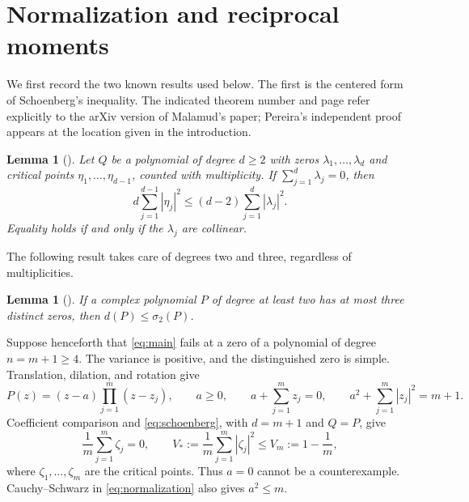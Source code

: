 \documentclass[11pt,reqno]{amsart}
\newtheorem{lem}[thm]{Lemma}
\theoremstyle{definition}
\theoremstyle{remark}
\numberwithin{equation}{section}
\begin{document}
\section{Normalization and reciprocal moments}\label{sec:reduction}

We first record the two known results used below. The first is the centered form of Schoenberg's inequality. The indicated theorem number and page refer explicitly to the arXiv version of Malamud's paper; Pereira's independent proof appears at the location given in the introduction.

\begin{lem}[{\cite[Theorem~4.10, p.~21, arXiv version]{Mal05}}]\label{lem:schoenberg}
Let $Q$ be a polynomial of degree $d\ge2$ with zeros $\lambda_1,\ldots,\lambda_d$ and critical points $\eta_1,\ldots,\eta_{d-1}$, counted with multiplicity. If $\sum_{j=1}^d\lambda_j=0$, then
\begin{equation}\label{eq:schoenberg}
 d\sum_{j=1}^{d-1}|\eta_j|^2
 \le(d-2)\sum_{j=1}^d|\lambda_j|^2.
\end{equation}
Equality holds if and only if the $\lambda_j$ are collinear.
\end{lem}

The following result takes care of degrees two and three, regardless of multiplicities.

\begin{lem}[{\cite[Theorem~3.2, p.~7, author version]{KPPSS11}}]\label{lem:three}
If a complex polynomial $P$ of degree at least two has at most three distinct zeros, then $d(P)\le\sigma_2(P)$.
\end{lem}

Suppose henceforth that \eqref{eq:main} fails at a zero of a polynomial of degree $n=m+1\ge4$. The variance is positive, and the distinguished zero is simple. Translation, dilation, and rotation give
\begin{equation}\label{eq:normalization}
 P(z)=(z-a)\prod_{j=1}^m(z-z_j),\qquad
 a\ge0,\qquad a+\sum_{j=1}^m z_j=0,\qquad
 a^2+\sum_{j=1}^m|z_j|^2=m+1.
\end{equation}
Coefficient comparison and \eqref{eq:schoenberg}, with $d=m+1$ and $Q=P$, give
\begin{equation}\label{eq:critical-moments}
 \frac1m\sum_{j=1}^m\zeta_j=0,\qquad
 V_*:=\frac1m\sum_{j=1}^m|\zeta_j|^2\le V_m:=1-\frac1m,
\end{equation}
where $\zeta_1,\ldots,\zeta_m$ are the critical points. Thus $a=0$ cannot be a counterexample. Cauchy--Schwarz in \eqref{eq:normalization} also gives $a^2\le m$.
\end{document}
